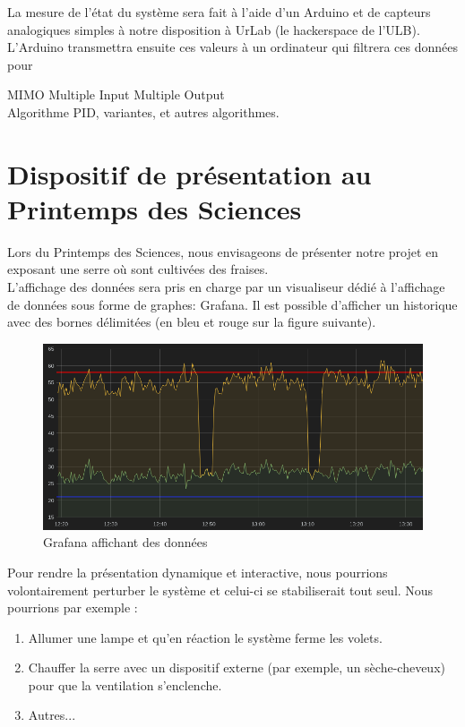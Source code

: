 \documentclass[a4paper,10pt]{article}
\begin{document}
La mesure de l'état du système sera fait à l'aide d'un Arduino et de capteurs analogiques simples à notre disposition à UrLab (le hackerspace de l'ULB). L'Arduino transmettra ensuite ces valeurs à un ordinateur qui filtrera ces données pour

MIMO Multiple Input Multiple Output \\

Algorithme PID, variantes, et autres algorithmes.\\

\section{Dispositif de présentation au Printemps des Sciences}

Lors du Printemps des Sciences, nous envisageons de présenter notre projet en exposant une serre où sont cultivées des fraises. \\

L'affichage des données sera pris en charge par un visualiseur dédié à l'affichage de données sous forme de graphes: Grafana. Il est possible d'afficher un historique avec des bornes délimitées (en bleu et rouge sur la figure suivante). \\

\thispagestyle{empty}
\begin{figure}[H]
\centering
\includegraphics[scale=0.5]{figures/Grafana.png}
\caption{Grafana affichant des données}
\label{grafana}
\end{figure}

Pour rendre la présentation dynamique et interactive, nous pourrions volontairement perturber le système et celui-ci se stabiliserait tout seul. Nous pourrions par exemple :
\begin{enumerate}
	\item Allumer une lampe et qu'en réaction le système ferme les volets.
	\item Chauffer la serre avec un dispositif externe (par exemple, un sèche-cheveux) pour que la ventilation s'enclenche.
	\item Autres... \\
\end{enumerate}
\end{document}
